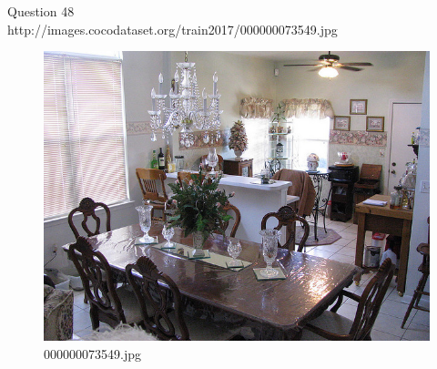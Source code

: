 Question 48\\
http://images.cocodataset.org/train2017/000000073549.jpg
\begin{figure}[h]
    \centering
    \includegraphics[width=0.8\linewidth]{../image set/hard/000000073549.jpg}
    \caption{000000073549.jpg}
\end{figure}

